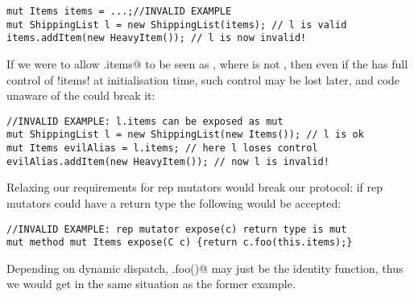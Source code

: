 \begin{lstlisting}
mut Items items = ...;//INVALID EXAMPLE
mut ShippingList l = new ShippingList(items); // l is valid
items.addItem(new HeavyItem()); // l is now invalid!
\end{lstlisting}
If we were to allow \Q@x.items@ to be seen as \Q@mut@, where \Q@x@ is not \Q@this@, then  even if the \Q@ShippingList@ has full control of \Q!items! at initialisation time, such control may be lost later, and code unaware of the \Q@ShippingList@ could break it:
\begin{lstlisting}
//INVALID EXAMPLE: l.items can be exposed as mut
mut ShippingList l = new ShippingList(new Items()); // l is ok
mut Items evilAlias = l.items; // here l loses control
evilAlias.addItem(new HeavyItem()); // now l is invalid!
\end{lstlisting}
Relaxing our requirements for rep mutators
would break our protocol: if rep mutators could have a \Q@mut@ return type the following would be accepted:
\begin{lstlisting}
//INVALID EXAMPLE: rep mutator expose(c) return type is mut
mut method mut Items expose(C c) {return c.foo(this.items);}
\end{lstlisting}
Depending on dynamic dispatch, \Q@c.foo()@ may just be the identity function, thus
we would get in the same situation as the former example.




